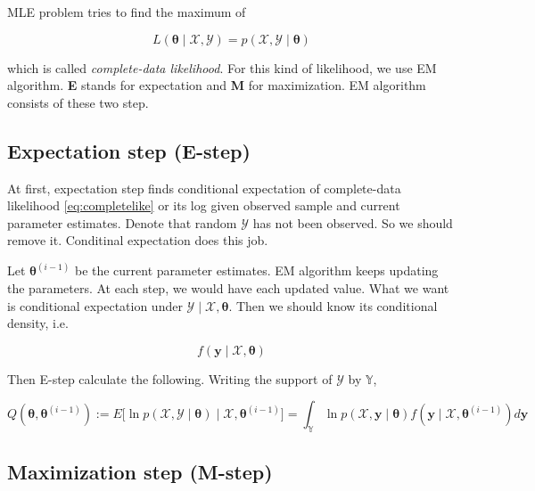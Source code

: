 \documentclass[]{book}
\theoremstyle{definition}
\theoremstyle{definition}
\theoremstyle{definition}
\theoremstyle{remark}
\begin{document}
MLE problem tries to find the maximum of

\begin{equation}
  L(\boldsymbol\theta \mid \mathcal{X}, \mathcal{Y}) = p(\mathcal{X}, \mathcal{Y} \mid \boldsymbol\theta)
  \label{eq:completelike}
\end{equation}

which is called \emph{complete-data likelihood}. For this kind of likelihood, we use EM algorithm. \textbf{E} stands for expectation and \textbf{M} for maximization. EM algorithm consists of these two step.

\hypertarget{expectation-step-e-step}{%
\subsection{Expectation step (E-step)}\label{expectation-step-e-step}}

At first, expectation step finds conditional expectation of complete-data likelihood \eqref{eq:completelike} or its log given observed sample and current parameter estimates. Denote that random \(\mathcal{Y}\) has not been observed. So we should remove it. Conditinal expectation does this job.

Let \(\boldsymbol\theta^{(i - 1)}\) be the current parameter estimates. EM algorithm keeps updating the parameters. At each step, we would have each updated value. What we want is conditional expectation under \(\mathcal{Y} \mid \mathcal{X}, \boldsymbol\theta\). Then we should know its conditional density, i.e.

\begin{equation}
  f(\mathbf{y} \mid \mathcal{X}, \boldsymbol\theta)
  \label{eq:missingcond}
\end{equation}

Then E-step calculate the following. Writing the support of \(\mathcal{Y}\) by \(\mathbb{Y}\),

\begin{equation}
  Q(\boldsymbol\theta, \boldsymbol\theta^{(i - 1)}) := E \bigg[ \ln p(\mathcal{X}, \mathcal{Y} \mid \boldsymbol\theta) \; \Big\vert \; \mathcal{X}, \boldsymbol\theta^{(i - 1)} \bigg] = \int_{\mathbb{Y}} \ln p(\mathcal{X}, \mathbf{y} \mid \boldsymbol\theta) f(\mathbf{y} \mid \mathcal{X}, \boldsymbol\theta^{(i - 1)}) d \mathbf{y}
  \label{eq:estep}
\end{equation}

\hypertarget{maximization-step-m-step}{%
\subsection{Maximization step (M-step)}\label{maximization-step-m-step}}
\end{document}
